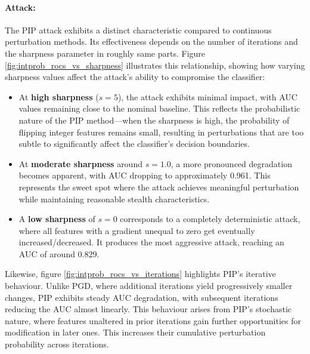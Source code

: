 \newpage
\paragraph{Attack:} The PIP attack exhibits a distinct characteristic compared to continuous perturbation methods. Its effectiveness depends on the number of iterations and the sharpness parameter in roughly same parts. Figure \ref{fig:intprob_rocs_vs_sharpness} illustrates this relationship, showing how varying sharpness values affect the attack's ability to compromise the classifier:

\begin{itemize}
    \item At \textbf{high sharpness} ($s = 5$), the attack exhibits minimal impact, with AUC values remaining close to the nominal baseline. This reflects the probabilistic nature of the PIP method—when the sharpness is high, the probability of flipping integer features remains small, resulting in perturbations that are too subtle to significantly affect the classifier's decision boundaries.
    \item At \textbf{moderate sharpness} around $s = 1.0$, a more pronounced degradation becomes apparent, with AUC dropping to approximately 0.961. This represents the sweet spot where the attack achieves meaningful perturbation while maintaining reasonable stealth characteristics. 
    \item A \textbf{low sharpness} of $s = 0$ corresponds to a completely deterministic attack, where all features with a gradient unequal to zero get eventually increased/decreased. It produces the most aggressive attack, reaching an AUC of around 0.829.
\end{itemize}


Likewise, figure \ref{fig:intprob_rocs_vs_iterations} highlights PIP's iterative behaviour. Unlike PGD, where additional iterations yield progressively smaller changes, PIP exhibits steady AUC degradation, with subsequent iterations reducing the AUC almost linearly. This behaviour arises from PIP's stochastic nature, where features unaltered in prior iterations gain further opportunities for modification in later ones. This increases their cumulative perturbation probability across iterations.

